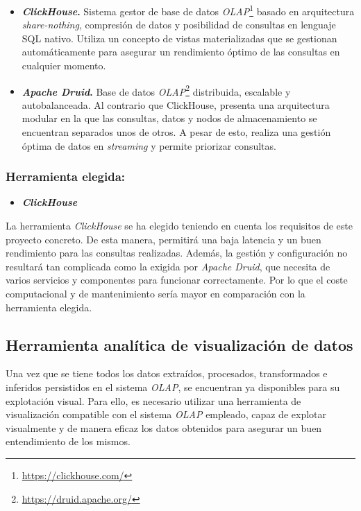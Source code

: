 \begin{itemize}
    \item \textbf{\textit{ClickHouse}.} Sistema gestor de base de datos \textit{OLAP}\footnote{\url{https://clickhouse.com/}} basado en arquitectura \textit{share-nothing}, compresión de datos y posibilidad de consultas en lenguaje SQL nativo. Utiliza un concepto de vistas materializadas que se gestionan automáticamente para asegurar un rendimiento óptimo de las consultas en cualquier momento.
    
    \item \textbf{\textit{Apache Druid}.} Base de datos \textit{OLAP}\footnote{\url{https://druid.apache.org/}} distribuida, escalable y autobalanceada. Al contrario que ClickHouse, presenta una arquitectura modular en la que las consultas, datos y nodos de almacenamiento se encuentran separados unos de otros. A pesar de esto, realiza una gestión óptima de datos en \textit{streaming} y permite priorizar consultas.
\end{itemize}

\subsubsection{Herramienta elegida:}

\begin{itemize}
    \item \textbf{\textit{ClickHouse}}
\end{itemize}

La herramienta \textit{ClickHouse} se ha elegido teniendo en cuenta los requisitos de este proyecto concreto. De esta manera, permitirá una baja latencia y un buen rendimiento para las consultas realizadas. Además, la gestión y configuración no resultará tan complicada como la exigida por \textit{Apache Druid}, que necesita de varios servicios y componentes para funcionar correctamente. Por lo que el coste computacional y de mantenimiento sería mayor en comparación con la herramienta elegida.

\subsection{Herramienta analítica de visualización de datos}

Una vez que se tiene todos los datos extraídos, procesados, transformados e inferidos persistidos en el sistema \textit{OLAP}, se encuentran ya disponibles para su explotación visual. Para ello, es necesario utilizar una herramienta de visualización compatible con el sistema \textit{OLAP} empleado, capaz de explotar visualmente y de manera eficaz los datos obtenidos para asegurar un buen entendimiento de los mismos.

